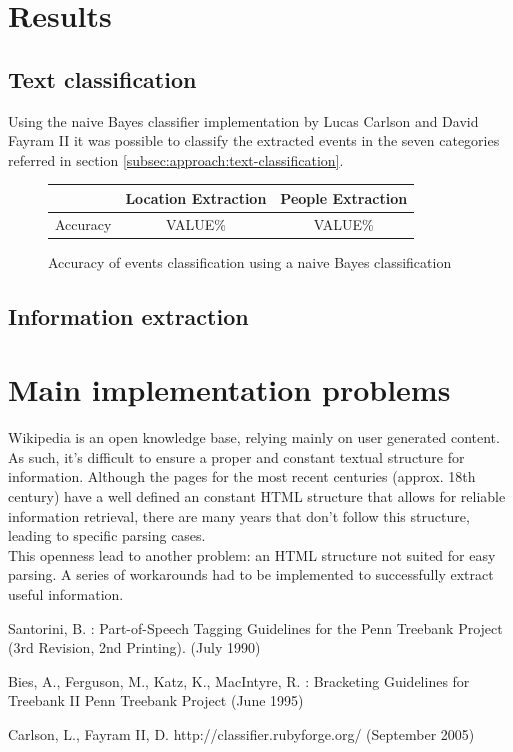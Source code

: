 \documentclass{llncs}
\begin{document}
\section{Results}

\subsection{Text classification}

Using the naive Bayes classifier implementation by Lucas Carlson and David Fayram II\cite{classifier} it was possible to classify the extracted events in the seven categories referred in section \ref{subsec:approach:text-classification}.

\begin{figure}[h]
	\centering
	\begin{tabular}{c|c|c}
		& Location Extraction & People Extraction\\
		\hline
		Accuracy & VALUE\% & VALUE\% \\
	\end{tabular}
	\caption{Accuracy of events classification using a naive Bayes classification}
	\label{fig:classifier-accuracy}
\end{figure}

\subsection{Information extraction}

\section{Main implementation problems}

Wikipedia is an open knowledge base, relying mainly on user generated content. As such, it's difficult to ensure a proper and constant textual structure for information. Although the pages for the most recent centuries (approx. 18th century) have a well defined an constant HTML structure that allows for reliable information retrieval, there are many years that don't follow this structure, leading to specific parsing cases.\\

This openness lead to another problem: an HTML structure not suited for easy parsing. A series of workarounds had to be implemented to successfully extract useful information.

%
%
\begin{thebibliography}{}
%
Santorini, B. :
Part-of-Speech Tagging Guidelines for the
Penn Treebank Project (3rd Revision, 2nd Printing).
(July 1990)

Bies, A., Ferguson, M., Katz, K., MacIntyre, R. :
Bracketing Guidelines for Treebank II
Penn Treebank Project
(June 1995)

Carlson, L., Fayram II, D.
http://classifier.rubyforge.org/
(September 2005)

\end{thebibliography}
\end{document}
